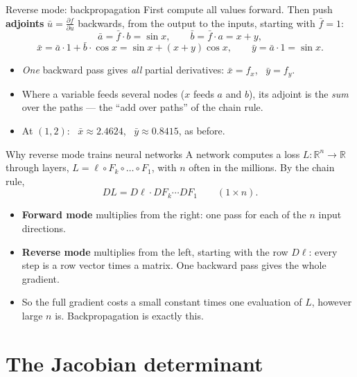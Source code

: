 \documentclass[10pt]{wosm-slides}
\newcommand{\R}{\mathbb{R}}
\newcommand{\pd}[2]{\frac{\partial #1}{\partial #2}}
\begin{document}
\begin{frame}{Reverse mode: backpropagation}
  First compute all values forward. Then push \textbf{adjoints} $\bar u = \pd{f}{u}$ backwards,
  from the output to the inputs, starting with $\bar f = 1$:
  \[ \bar a = \bar f \cdot b = \sin x, \qquad \bar b = \bar f \cdot a = x + y, \]
  \[ \bar x = \bar a \cdot 1 + \bar b \cdot \cos x = \sin x + (x + y)\cos x, \qquad \bar y = \bar a \cdot 1 = \sin x . \]
  \pause
  \begin{itemize}
    \item \emph{One} backward pass gives \emph{all} partial derivatives: $\bar x = f_x$, \ $\bar y = f_y$.
    \item Where a variable feeds several nodes ($x$ feeds $a$ and $b$), its adjoint is the \emph{sum}
      over the paths --- the ``add over paths'' of the chain rule.
    \item At $(1, 2)$: \ $\bar x \approx 2.4624$, \ $\bar y \approx 0.8415$, as before.
  \end{itemize}
\end{frame}

\begin{frame}{Why reverse mode trains neural networks}
  A network computes a loss $L\colon \R^n \to \R$ through layers, $L = \ell \circ F_k \circ \dots \circ F_1$,
  with $n$ often in the millions. By the chain rule,
  \[ DL = D\ell \cdot DF_k \cdots DF_1 \qquad (1 \times n) . \]
  \pause
  \begin{itemize}
    \item \textbf{Forward mode} multiplies from the right: one pass for each of the $n$ input directions.
    \item \textbf{Reverse mode} multiplies from the left, starting with the row $D\ell$: every step is
      a row vector times a matrix. One backward pass gives the whole gradient.
    \item So the full gradient costs a small constant times one evaluation of $L$, however large $n$ is.
      Backpropagation is exactly this.
  \end{itemize}
\end{frame}

\section{The Jacobian determinant}
\end{document}
